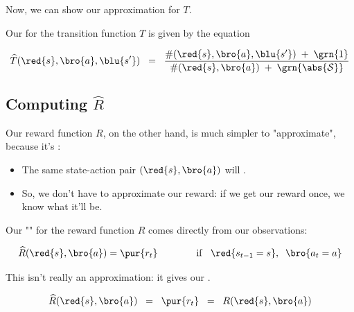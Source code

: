        

        Now, we can show our approximation for $T$.\\


        \begin{kequation}
            Our  for the transition function $T$ is given by the equation

            \begin{equation*}
                \widehat{T} (\red{s},\bro{a},\blu{s'})  \;\;=\;\;
                \frac{\#(\red{s},\bro{a},\blu{s'}) \;+\;\grn{1}}{\#(\red{s},\bro{a}) \;+\; \grn{\abs{\mathcal{S}}}} 
            \end{equation*}
        \end{kequation}




    \pagebreak

    \subsection{Computing $\widehat{R}$}

        Our reward function $R$, on the other hand, is much simpler to "approximate", because it's :

        \begin{itemize}
            \item The same state-action pair $(\red{s},\bro{a})$ will .
            \item So, we don't have to approximate our reward: if we get our reward once, we know  what it'll be.\\
        \end{itemize}

        \begin{kequation}
            Our "" for the reward function $R$ comes directly from our observations:

            \begin{equation*}
                \widehat{R}(\red{s},\bro{a}) = \pur{r_t} \qquad \qquad 
                \text{if } \;\;\red{s_{t-1}=s}, \;\; \bro{a_t=a}
            \end{equation*}

            This isn't really an approximation: it gives our .

            \begin{equation*}
                \widehat{R}(\red{s},\bro{a}) \;\;=\;\; 
                \pur{r_t}  \;\;=\;\; 
                R(\red{s},\bro{a})
            \end{equation*}
        \end{kequation}

